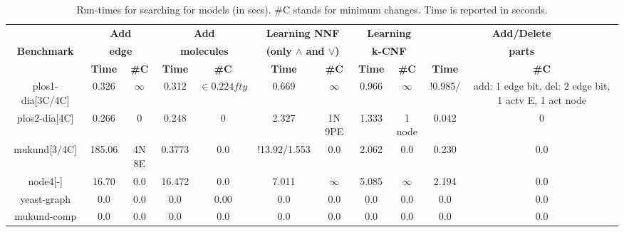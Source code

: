 \begin{table}[t]
  \centering
  \begin{tabular}[t]{|c@{}|@{}c@{}|@{}c@{}|@{}c@{}|@{}c@{}|@{}c@{}|@{}c@{}|@{}c@{}|@{}c@{}|@{}c@{}|@{}c@{}|}\hline
    {\multirow{2}{*} \textbf{}}  & \multicolumn{2}{c|}{\textbf{Add}} & \multicolumn{2}{c|}{\textbf{Add}} & \multicolumn{2}{c|}{\textbf{Learning NNF}}  &  \multicolumn{2}{c|}{\textbf{Learning}} &  \multicolumn{2}{c|}{\textbf{Add/Delete}} \\
    {\multirow{2}{*} \textbf{Benchmark}}  & \multicolumn{2}{c|}{\textbf{edge}} & \multicolumn{2}{c|}{\textbf{molecules}} & \multicolumn{2}{c|}{\textbf{(only $\land$ and $\lor$)}}  &  \multicolumn{2}{c|}{\textbf{k-CNF}} &  \multicolumn{2}{c|}{\textbf{parts}} \\
    \cline{2-11}
    {} & {\textbf{Time}} & {\textbf{\#C}} & {\textbf{Time}} & {\textbf{\#C}} & {\textbf{Time}} & {\textbf{\#C}} & {\textbf{Time}} & {\textbf{\#C}} & {\textbf{Time}} & {\textbf{\#C}} \\
    \hline
    
    plos1-dia[3C/4C]& 0.326 &$\infty$& 0.312 &$\in0.224fty$& 0.669 & $\infty$ & 0.966 &$\infty$& !0.985/ & add: 1 edge bit, del: 2 edge bit, 1 actv E, 1 act node\\\hline
    plos2-dia[4C] & 0.266 & 0   & 0.248 & 0  & 2.327  & 1N 9PE   & 1.333 & 1 node & 0.042  & 0 \\\hline
    mukund[3/4C]  & 185.06 & 4N 8E  & 0.3773 & 0.0    & !13.92/1.553& 0.0      & 2.062 & 0.0    & 0.230  & 0.0 \\\hline
    node4[-]      & 16.70  & 0.0    & 16.472 & 0.0    & 7.011       & $\infty$ & 5.085 &$\infty$& 2.194  & 0.0\\\hline
    yeast-graph   & 0.0    & 0.0    & 0.0    & 0.00   & 0.0         & 0.0      & 0.0   & 0.0    & 0.0    & 0.0 \\\hline
    mukund-comp   & 0.0    & 0.0    & 0.0    & 0.0    & 0.0         & 0.0      & 0.0   & 0.0    & 0.0    & 0.0\\\hline
  \end{tabular}
  \caption{Run-times for searching for models (in secs). \#C  stands for minimum changes.
  Time is reported in seconds.}
  \label{tab:qf-graph}
\end{table}

